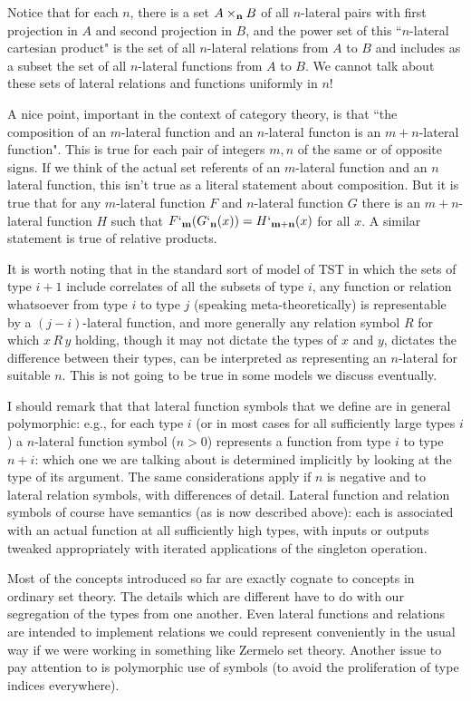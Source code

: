 \documentclass[12pt]{article}
\begin{document}
Notice that for each $n$, there is a set $A \times_{\bf n} B$ of all $n$-lateral pairs with first projection in $A$ and second projection in $B$,
and the power set of this ``$n$-lateral cartesian product"  is  the  set of all $n$-lateral relations from $A$ to $B$ and includes as a subset the set of all $n$-lateral functions from $A$ to $B$.  We cannot talk about these sets of lateral relations and functions uniformly in $n$!

A nice point, important in the context of category theory, is that ``the composition of an $m$-lateral function and an $n$-lateral functon is an $m+n$-lateral function".   This is true for each pair of integers $m,n$ of the same or of opposite signs.  If we think of
the actual set referents of an $m$-lateral function and an $n$ lateral function, this isn't true as a literal statement about composition.  But it is true that for any $m$-lateral function
$F$ and $n$-lateral function $G$ there is an $m+n$-lateral function $H$ such that $F`_{\bf m}(G`_{\bf n}(x)) = H`_{\bf m+n}(x)$ for all $x$.  A similar statement is true of relative products.

It is worth noting that in the standard sort of model of TST in which the sets of type $i+1$ include correlates of all the subsets of type $i$, any function or relation whatsoever from 
type $i$ to type $j$ (speaking meta-theoretically) is representable by a $(j-i)$-lateral function, and more generally any relation symbol $R$ for which $x\,R\, y$ holding, though it may not dictate the types of $x$ and $y$, dictates the difference between their types, can be interpreted as representing an $n$-lateral for suitable $n$.   This is not going to be true in some models we discuss eventually.

I should remark that that lateral function symbols that we define are in general  polymorphic:  e.g., for each type $i$ (or in most cases for all sufficiently large types $i$) a $n$-lateral function symbol ($n>0$)
represents a function from type $i$ to type $n+i$:  which one we are talking about is determined implicitly by looking at the type of its argument.  The same considerations apply if $n$ is negative and to lateral relation symbols, with differences of detail.  Lateral function and relation symbols of course have semantics (as is now described above):  each is associated with an actual function
at all sufficiently high types, with inputs or outputs tweaked appropriately with iterated applications of the singleton operation.

Most of the concepts introduced so far are exactly cognate to concepts in ordinary set theory.  The details which are different have to do with our segregation of the types from one another.
Even lateral functions and relations are intended to implement relations we could represent conveniently in the usual way if we were working in something like Zermelo set theory.  Another issue to pay attention to is polymorphic use of symbols (to avoid the proliferation of type indices everywhere).
\end{document}
